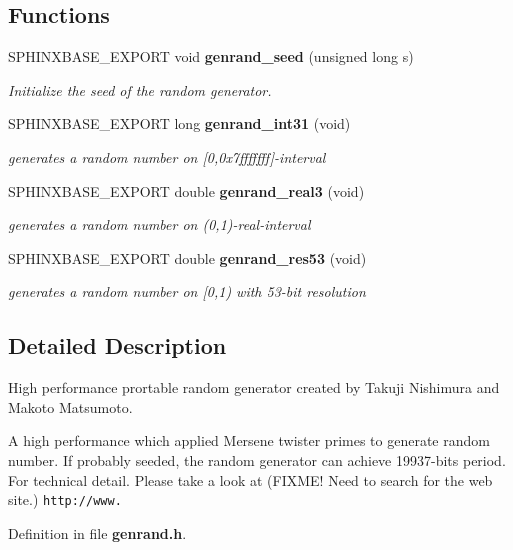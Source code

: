 \subsection*{Functions}
\begin{CompactItemize}
\item 
SPHINXBASE\_\-EXPORT void {\bf genrand\_\-seed} (unsigned long s)\label{genrand_8h_2881c7b606d9a2b2852e5946d71d32b7}

\begin{CompactList}\small\item\em Initialize the seed of the random generator. \item\end{CompactList}\item 
SPHINXBASE\_\-EXPORT long {\bf genrand\_\-int31} (void)\label{genrand_8h_10263695978c84103fb3526fdae21d4c}

\begin{CompactList}\small\item\em generates a random number on [0,0x7fffffff]-interval \item\end{CompactList}\item 
SPHINXBASE\_\-EXPORT double {\bf genrand\_\-real3} (void)\label{genrand_8h_d5fbfda1cb738d2beff277444bc71b1a}

\begin{CompactList}\small\item\em generates a random number on (0,1)-real-interval \item\end{CompactList}\item 
SPHINXBASE\_\-EXPORT double {\bf genrand\_\-res53} (void)\label{genrand_8h_2fca03c5dad1835f55e09c6e66d3b960}

\begin{CompactList}\small\item\em generates a random number on [0,1) with 53-bit resolution \item\end{CompactList}\end{CompactItemize}


\subsection{Detailed Description}
High performance prortable random generator created by Takuji Nishimura and Makoto Matsumoto. 

A high performance which applied Mersene twister primes to generate random number. If probably seeded, the random generator can achieve 19937-bits period. For technical detail. Please take a look at (FIXME! Need to search for the web site.) {\tt http://www.} 

Definition in file {\bf genrand.h}.